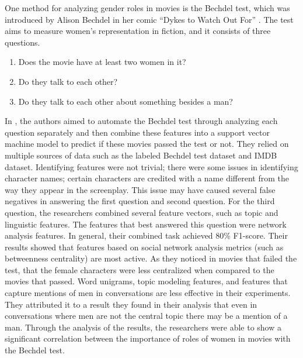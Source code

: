 \documentclass[11pt,a4paper]{article}
\begin{document}
One method for analyzing gender roles in movies is the Bechdel test, which was introduced by Alison Bechdel in her comic “Dykes to Watch Out For” \cite{bechdel1986dykes}. The test aims to measure women’s representation in fiction, and it consists of three questions. 
\begin{enumerate}
    \item Does the movie have at least two women in it?
    \item Do they talk to each other?
    \item Do they talk to each other about something besides a man?
\end{enumerate}
In \cite{Agarwal2015AutomatingTest}, the authors aimed to automate the Bechdel test through analyzing each question separately and then combine these features into a support vector machine model to predict if these movies passed the test or not. They relied on multiple sources of data such as the labeled Bechdel test dataset and IMDB dataset. Identifying features were not trivial; there were some issues in identifying character names; certain characters are credited with a name different from the way they appear in the screenplay. This issue may have caused several false negatives in answering the first question and second question. For the third question, the researchers combined several feature vectors, such as topic and linguistic features. The features that best answered this question were network analysis features. In general, their combined task achieved 80\% F1-score. Their results showed that features based on social network analysis metrics (such as betweenness centrality) are most active. As they noticed in movies that failed the test, that the female characters were less centralized when compared to the movies that passed.  Word unigrams, topic modeling features, and features that capture mentions of men in conversations are less effective in their experiments. They attributed it to a result they found in their analysis that even in conversations where men are not the central topic there may be a mention of a man. Through the analysis of the results, the researchers were able to show a significant correlation between the importance of roles of women in movies with the Bechdel test.\\

\end{document}
